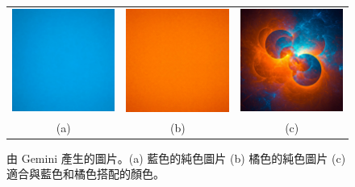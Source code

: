 \documentclass[12pt]{report}
\theoremstyle{plain}
\begin{document}
\begin{figure}[t]
    \centering
    \begin{tabular}{ccc}
         \includegraphics[width=0.3\linewidth]{fig/Gemini_Generated_Image_53joui53joui53jo.jpg}
         &\includegraphics[width=0.3\linewidth]{fig/Gemini_Generated_Image_8hz5mu8hz5mu8hz5.jpg}
         &\includegraphics[width=0.3\linewidth]{fig/Gemini_Generated_Image_k9qf9ik9qf9ik9qf.jpg} \\
         (a)&(b)  &(c) \\
    \end{tabular}
    \caption[使用表格的多圖排版演示]{由 Gemini 產生的圖片。(a) 藍色的純色圖片 (b) 橘色的純色圖片 (c) 適合與藍色和橘色搭配的顏色。}
    \label{fig:multifig1}
\end{figure}
\end{document}
